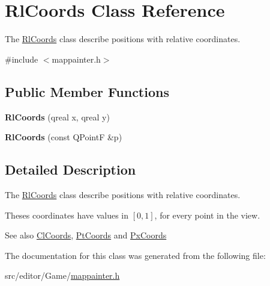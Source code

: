 \hypertarget{class_rl_coords}{\section{\-Rl\-Coords \-Class \-Reference}
\label{class_rl_coords}
}


\-The \hyperlink{class_rl_coords}{\-Rl\-Coords} class describe positions with relative coordinates.  




{\ttfamily \#include $<$mappainter.\-h$>$}

\subsection*{\-Public \-Member \-Functions}
\begin{DoxyCompactItemize}
\item 
\hypertarget{class_rl_coords_ada69216f57050aa6a7b88aa4cb051335}{{\bfseries \-Rl\-Coords} (qreal x, qreal y)}\label{class_rl_coords_ada69216f57050aa6a7b88aa4cb051335}

\item 
\hypertarget{class_rl_coords_a71620c03bf57e61ec3b35af29dab3382}{{\bfseries \-Rl\-Coords} (const \-Q\-Point\-F \&p)}\label{class_rl_coords_a71620c03bf57e61ec3b35af29dab3382}

\end{DoxyCompactItemize}


\subsection{\-Detailed \-Description}
\-The \hyperlink{class_rl_coords}{\-Rl\-Coords} class describe positions with relative coordinates. 

\-Theses coordinates have values in $[0,1]$, for every point in the view.

\-See also \hyperlink{class_cl_coords}{\-Cl\-Coords}, \hyperlink{class_pt_coords}{\-Pt\-Coords} and \hyperlink{class_px_coords}{\-Px\-Coords} 

\-The documentation for this class was generated from the following file\-:\begin{DoxyCompactItemize}
\item 
src/editor/\-Game/\hyperlink{mappainter_8h}{mappainter.\-h}\end{DoxyCompactItemize}
